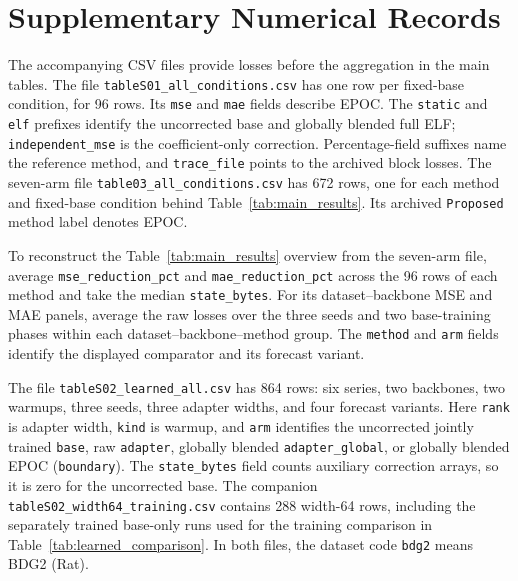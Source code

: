 \appendices
\setcounter{table}{0}
\renewcommand{\thetable}{S\arabic{table}}
\renewcommand{\theHtable}{supp.\arabic{table}}

\section{Supplementary Numerical Records}
\label{app:records}

\begin{table}[!t]
\caption{Common evaluation settings and learned-adapter training configuration for the supplementary records. The fixed-base training and comparator protocols are given in Section~\ref{sec:experimental_setup}.}
\label{tab:s_settings}
\centering

\end{table}

The accompanying CSV files provide losses before the aggregation in the main tables. The file \texttt{tableS01\_\allowbreak all\_\allowbreak conditions.csv} has one row per fixed-base condition, for 96 rows. Its \texttt{mse} and \texttt{mae} fields describe EPOC. The \texttt{static} and \texttt{elf} prefixes identify the uncorrected base and globally blended full ELF; \texttt{independent\_mse} is the coefficient-only correction. Percentage-field suffixes name the reference method, and \texttt{trace\_file} points to the archived block losses. The seven-arm file \texttt{table03\_\allowbreak all\_\allowbreak conditions.csv} has 672 rows, one for each method and fixed-base condition behind Table~\ref{tab:main_results}. Its archived \texttt{Proposed} method label denotes EPOC.

To reconstruct the Table~\ref{tab:main_results} overview from the seven-arm file, average \texttt{mse\_reduction\_pct} and \texttt{mae\_reduction\_pct} across the 96 rows of each method and take the median \texttt{state\_bytes}. For its dataset--backbone MSE and MAE panels, average the raw losses over the three seeds and two base-training phases within each dataset--backbone--method group. The \texttt{method} and \texttt{arm} fields identify the displayed comparator and its forecast variant.

The file \texttt{tableS02\_\allowbreak learned\_\allowbreak all.csv} has 864 rows: six series, two backbones, two warmups, three seeds, three adapter widths, and four forecast variants. Here \texttt{rank} is adapter width, \texttt{kind} is warmup, and \texttt{arm} identifies the uncorrected jointly trained \texttt{base}, raw \texttt{adapter}, globally blended \texttt{adapter\_global}, or globally blended EPOC (\texttt{boundary}). The \texttt{state\_bytes} field counts auxiliary correction arrays, so it is zero for the uncorrected base. The companion \texttt{tableS02\_\allowbreak width64\_\allowbreak training.csv} contains 288 width-64 rows, including the separately trained base-only runs used for the training comparison in Table~\ref{tab:learned_comparison}. In both files, the dataset code \texttt{bdg2} means BDG2 (Rat).

